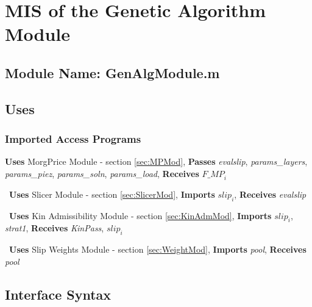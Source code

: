 \documentclass[12pt, titlepage]{article}
\begin{document}

\section{MIS of the Genetic Algorithm Module} \label{sec:GenAlgMod}

\subsection{Module Name: GenAlgModule.m}

\subsection{Uses}

\subsubsection{Imported Access Programs}
\noindent
\textbf{Uses} MorgPrice Module - section \ref{sec:MPMod},
\textbf{Passes} \textit{evalslip}, \textit{params\_layers},
\textit{params\_piez}, \textit{params\_soln}, 
\textit{params\_load}, \textbf{Receives} $\textit{F\_MP}_{i}$

~\newline\noindent \textbf{Uses} Slicer Module - section
\ref{sec:SlicerMod}, \textbf{Imports} $\textit{slip}_{i}$,
\textbf{Receives} \textit{evalslip}

~\newline\noindent \textbf{Uses} Kin Admissibility Module - section
\ref{sec:KinAdmMod}, \textbf{Imports} $\textit{slip}_{i}$,
\textit{strat1}, \textbf{Receives} \textit{KinPass},
$\textit{slip}_{i}$

~\newline\noindent \textbf{Uses} Slip Weights Module - section
\ref{sec:WeightMod}, \textbf{Imports} \textit{pool}, \textbf{Receives}
\textit{pool}

\subsection{Interface Syntax}
\end{document}
